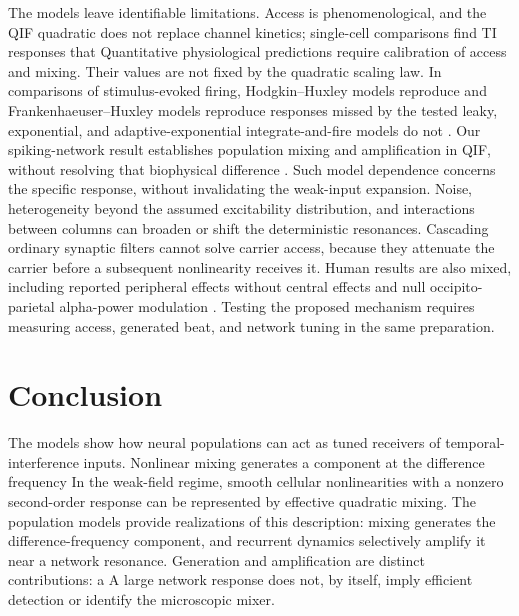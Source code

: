 \documentclass[11pt,a4paper]{article}
\providecommand{\DIFaddtex}[1]{{\protect\color{blue} \sf #1}} %
\providecommand{\DIFdeltex}[1]{{\protect\color{red} \scriptsize #1}} %
\providecommand{\DIFaddbegin}{} %
\providecommand{\DIFaddend}{} %
\providecommand{\DIFdelbegin}{} %
\providecommand{\DIFdelend}{} %
\providecommand{\DIFadd}[1]{\texorpdfstring{\DIFaddtex{#1}}{#1}} %
\providecommand{\DIFdel}[1]{\texorpdfstring{\DIFdeltex{#1}}{}} %
\begin{document}
\DIFdelbegin \DIFdel{The models leave identifiable limitations. Access is phenomenological, and the
QIF quadratic does not replace channel kinetics; single-cell comparisons find
TI responses that }\DIFdelend \DIFaddbegin \DIFadd{Quantitative physiological predictions require calibration of access and mixing.
Their values are not fixed by the quadratic scaling law. In comparisons of
stimulus-evoked firing, }\DIFaddend Hodgkin--Huxley \DIFdelbegin \DIFdel{models reproduce }\DIFdelend and \DIFaddbegin \DIFadd{Frankenhaeuser--Huxley models reproduce
responses missed by the tested leaky, exponential, and adaptive-exponential
}\DIFaddend integrate-and-fire models \DIFdelbegin \DIFdel{do not \cite{plovie2025}. Our spiking-network result establishes population mixing
and amplification in QIF, without resolving that biophysical difference}\DIFdelend \DIFaddbegin \DIFadd{\cite{plovie2025}}\DIFaddend . \DIFaddbegin \DIFadd{Such model dependence concerns the
specific response, without invalidating the weak-input expansion. }\DIFaddend Noise,
heterogeneity beyond the assumed excitability distribution, and interactions
between columns can broaden or shift the deterministic resonances. Cascading
ordinary synaptic filters cannot solve carrier access, because they attenuate
the carrier before a subsequent nonlinearity receives it. Human results are also
mixed, including reported peripheral effects without central effects
\cite{iszak2023} and null occipito-parietal alpha-power modulation
\cite{mansourinezhad2025}. Testing the proposed mechanism requires measuring
access, generated beat, and network tuning in the same preparation.

\section{Conclusion}
\DIFdelbegin \DIFdel{The models show how neural populations can act as tuned receivers of temporal-interference
inputs. Nonlinear mixing generates
a component at the difference frequency}\DIFdelend \DIFaddbegin \DIFadd{In the weak-field regime, smooth cellular nonlinearities with a nonzero
second-order response can be represented by effective quadratic mixing. The
population models provide realizations of this description: mixing generates
the difference-frequency component}\DIFaddend , and recurrent dynamics \DIFdelbegin \DIFdel{selectively }\DIFdelend amplify it near a
network resonance. \DIFdelbegin \DIFdel{Generation and amplification are
distinct contributions: a }\DIFdelend \DIFaddbegin \DIFadd{A }\DIFaddend large network response does not, by itself, imply efficient
detection \DIFaddbegin \DIFadd{or identify the microscopic mixer}\DIFaddend .
\end{document}

